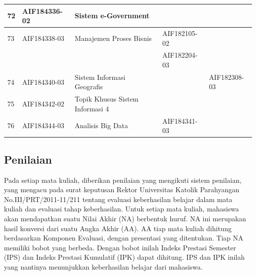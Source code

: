 \begin{table}[H]
\begin{tabular}{|p{0.5cm}|p{2.85cm}|p{4.95cm}|p{2.7cm}|p{2.7cm}|}
72 & AIF184336-02 & Sistem e-Government                                              &              &                    \\ \hline
73 & AIF184338-03 & Manajemen Proses Bisnis                                          & AIF182105-02 &                    \\ 
   &              &                                                                  & AIF182204-03 &                    \\ \hline
74 & AIF184340-03 & Sistem Informasi Geografis                                       &              & AIF182308-03       \\ \hline
75 & AIF184342-02 & Topik Khusus Sistem Informasi 4                                  &              &                    \\ \hline
76 & AIF184344-03 & Analisis Big Data                                                & AIF184341-03 &                    \\ \hline
		\end{tabular}
	\label{tab:DaftarMataKuliahWajibDanPrasyaratnya3}
\end{table}

\subsection{Penilaian}
\label{sec:penilaian}

Pada setiap mata kuliah, diberikan penilaian yang mengikuti sistem penilaian, yang mengacu pada surat keputusan Rektor Universitas Katolik Parahyangan No.III/PRT/2011-11/211 tentang evaluasi keberhasilan belajar dalam mata kuliah dan evaluasi tahap keberhasilan. Untuk setiap mata kuliah, mahasiswa akan mendapatkan suatu Nilai Akhir (NA) berbentuk huruf. NA ini merupakan hasil konversi dari suatu Angka Akhir (AA). AA tiap mata kuliah dihitung berdasarkan Komponen Evaluasi, dengan presentasi yang ditentukan. Tiap NA memiliki bobot yang berbeda. Dengan bobot inilah Indeks Prestasi Semester (IPS) dan Indeks Prestasi Kumulatif (IPK) dapat dihitung. IPS dan IPK inilah yang nantinya menunjukkan keberhasilan belajar dari mahasiswa.


